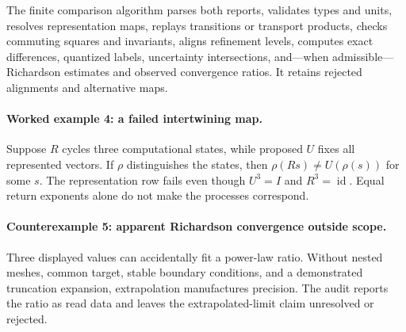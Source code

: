 The finite comparison algorithm parses both reports, validates types and units, resolves representation maps,
replays transitions or transport products, checks commuting squares and invariants, aligns refinement levels, computes
exact differences, quantized labels, uncertainty intersections, and---when admissible---Richardson estimates and
observed convergence ratios.  It retains rejected alignments and alternative maps.

\paragraph{Worked example 4: a failed intertwining map.}
Suppose \(R\) cycles three computational states, while proposed \(U\) fixes all represented vectors.  If
\(\rho\) distinguishes the states, then \(\rho(Rs)\ne U(\rho(s))\) for some \(s\).  The representation row fails even
though \(U^3=I\) and \(R^3=\operatorname{id}\).  Equal return exponents alone do not make the processes correspond.

\paragraph{Counterexample 5: apparent Richardson convergence outside scope.}
Three displayed values can accidentally fit a power-law ratio.  Without nested meshes, common target, stable boundary
conditions, and a demonstrated truncation expansion, extrapolation manufactures precision.  The audit reports the
ratio as read data and leaves the extrapolated-limit claim unresolved or rejected.
